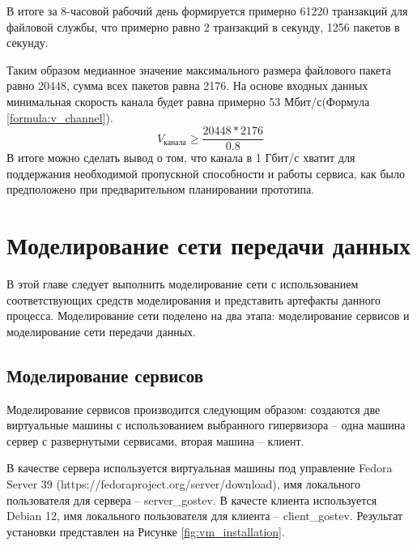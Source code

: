 \documentclass[14pt, a4paper]{extarticle}
\numberwithin{equation}{section}
\begin{document}
В итоге за 8-часовой рабочий день формируется примерно 61220 транзакций для 
файловой службы, что примерно равно 
2 транзакций в секунду, 1256 пакетов в секунду.

Таким образом медианное значение максимального размера файлового пакета равно 20448, сумма всех пакетов равна 2176.
На основе входных данных минимальная скорость канала будет равна примерно 53 Мбит/с(Формула \ref{formula:v_channel}).
\begin{equation}
        V_\text{канала} \ge \frac{20448 * 2176}{0.8}
        \label{formula:v_channel}
\end{equation}
В итоге можно сделать вывод о том, что канала в 1 Гбит/с хватит для поддержания необходимой пропускной способности и работы сервиса, как было предположено при предварительном планировании прототипа. 


\section{Моделирование сети передачи данных}
В этой главе следует выполнить моделирование сети с использованием соответствующих 
средств моделирования и представить артефакты данного процесса. 
Моделирование сети поделено на два этапа: моделирование сервисов и моделирование сети передачи данных. 

\subsection{Моделирование сервисов}
Моделирование сервисов производится следующим образом: 
создаются две виртуальные машины с использованием выбранного гипервизора – 
одна машина сервер с развернутыми сервисами, вторая машина – клиент.

В качестве сервера используется виртуальная машины под управление Fedora Server 39 \cite{}(https://fedoraproject.org/server/download), 
имя локального пользователя для сервера -- server\_gostev.
В качесте клиента используется Debian 12, имя локального пользователя для клиента -- client\_gostev. 
Результат установки представлен на Рисунке \ref{fig:vm_installation}.
\end{document}
